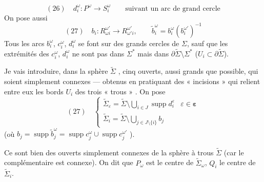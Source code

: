 \documentclass[11pt,a4paper]{article}
\begin{document}
\[
  (26)\quad d_i^{\omega} : P^{\omega} \longrightarrow S_i^{\omega}
  \qquad \text{suivant un arc de grand cercle}
\]
On pose aussi
\[
  (27)\quad b_i : R_{\omega i}^{\omega'} \longrightarrow R_{\omega' i}^{\omega'}, \qquad
  \widetilde{b}_i^{\omega} = b_i^{\omega} (b_i^{\omega'})^{-1}
\]
Tous les arcs $b_i^{\omega}$, $c_i^{\omega}$, $d_i^{\omega}$ se font sur des
grands cercles de $\Sigma$, sauf que les extrémités des $c_i^{\omega}$,
$d_i^{\omega}$ ne sont pas dans $\Sigma^{*}$ mais dans
$\partial\widetilde{\Sigma} \setminus \Sigma^{*}$ ($U_i \subset \partial\widetilde{\Sigma}$).

Je vais introduire, dans la sphère $\widetilde{\Sigma}$ , cinq ouverts, aussi grands que possible, qui soient
simplement connexes — obtenus en pratiquant des « incisions » qui relient entre eux les
 bords $U_i$ des trois « trous » \struck{\ill{}}. On pose
\[
  (27)\quad
  \left\{
  \begin{array}{ll}
    \widetilde{\Sigma}_\varepsilon = \widetilde{\Sigma} \setminus
      \bigcup_{i \in J} \operatorname{supp} d_i^{\varepsilon}
      & \varepsilon \in \boldsymbol{\varepsilon} \\[4pt]
    \widetilde{\Sigma}_i = \widetilde{\Sigma} \setminus
      \bigcup_{j \in J \setminus \{i\}} b_j &
  \end{array}
  \right.
\]
(où $b_j = \operatorname{supp} \widetilde{b}_j^{\omega}
= \operatorname{supp} c_j^{\omega} \cup \operatorname{supp} c_j^{\omega'}$ ).

Ce sont bien des ouverts  simplement connexes
de la sphère à trous $\widetilde{\Sigma}$ (car le complémentaire  est
connexe). On dit que $P_\omega$ est le centre de $\widetilde{\Sigma}_\omega$, $Q_i$ le
centre de $\widetilde{\Sigma}_i$.
\end{document}
